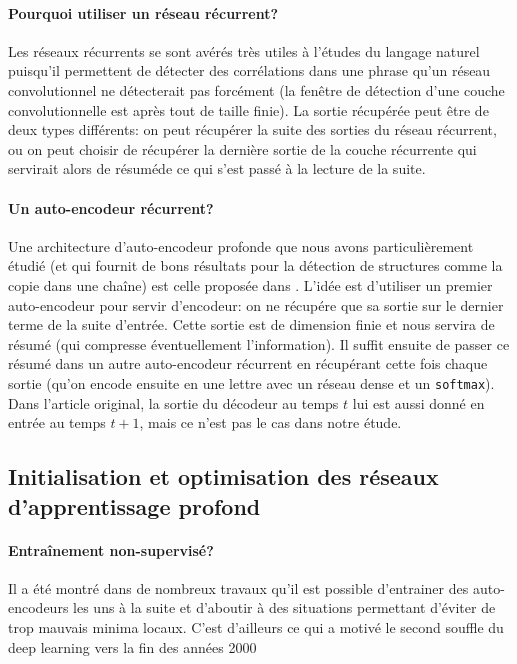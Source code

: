 \documentclass[a4paper, journal, 11pt, onecolumn]{IEEEtran}
\begin{document}
\paragraph{Pourquoi utiliser un réseau récurrent?}

Les réseaux récurrents se sont avérés très utiles à l'études du langage naturel
puisqu'il permettent de détecter des corrélations dans une phrase qu'un réseau
convolutionnel ne détecterait pas forcément (la fenêtre de détection d'une
couche convolutionnelle est après tout de taille finie).  La sortie récupérée
peut être de deux types différents: on peut récupérer la suite des sorties du
réseau récurrent, ou on peut choisir de récupérer la dernière sortie de la
couche récurrente qui servirait alors de \og résumé\fg de ce qui s'est passé à
la lecture de la suite.

\paragraph{Un auto-encodeur récurrent?}

Une architecture d'auto-encodeur profonde que nous avons particulièrement étudié
(et qui fournit de bons résultats pour la détection de structures comme la copie
dans une chaîne) est celle proposée dans \cite{DBLP:journals/corr/ChoMGBSB14}.
L'idée est d'utiliser un premier auto-encodeur pour servir d'encodeur: on ne
récupére que sa sortie sur le dernier terme de la suite d'entrée. Cette sortie
est de dimension finie et nous servira de résumé (qui compresse éventuellement
l'information). Il suffit ensuite de passer ce résumé dans un autre
auto-encodeur récurrent en récupérant cette fois chaque sortie (qu'on encode
ensuite en une lettre avec un réseau dense et un \texttt{softmax}). Dans
l'article original, la sortie du décodeur au temps $t$ lui est aussi donné en
entrée au temps $t+1$, mais ce n'est pas le cas dans notre étude.

\subsection{Initialisation et optimisation des réseaux d'apprentissage profond}

\paragraph{Entraînement non-supervisé?}

Il a été montré dans de nombreux travaux qu'il est possible d'entrainer des
auto-encodeurs les uns à la suite et d'aboutir à des situations permettant
d'éviter de trop mauvais minima locaux. C'est d'ailleurs ce qui a motivé le
second souffle du deep learning vers la fin des années 2000
\end{document}
